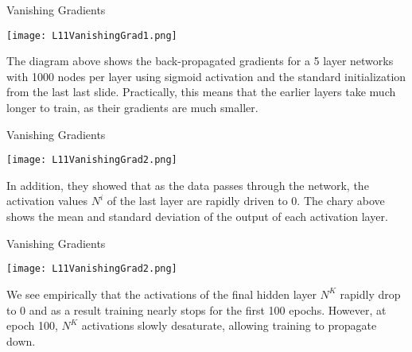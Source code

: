 \documentclass[10pt, table, dvipsnames,xcdraw,handout]{beamer}
\begin{document}
\begin{frame}[fragile]{Vanishing Gradients}
  \begin{minipage}[t][0.5\textheight][t]{\textwidth}
	\centering \texttt{[image: L11VanishingGrad1.png]} 
  \end{minipage}
  \vfill
\begin{minipage}[t][0.5\textheight][t]{\textwidth}
The diagram above shows the back-propagated gradients for a 5 layer networks with 1000 nodes per layer using sigmoid activation and the standard initialization from the last last slide.  Practically, this means that the earlier layers take much longer to train, as their gradients are much smaller.
\end{minipage}
\end{frame}



\begin{frame}[fragile]{Vanishing Gradients}
  \begin{minipage}[t][0.5\textheight][t]{\textwidth}
	\centering \texttt{[image: L11VanishingGrad2.png]} 
  \end{minipage}
  \vfill
\begin{minipage}[t][0.5\textheight][t]{\textwidth}
In addition, they showed that as the data passes through the network, the activation values $N^i$ of the last layer are rapidly driven to 0. The chary above shows the mean and standard deviation of the output of each activation layer.
\end{minipage}
\end{frame}



\begin{frame}[fragile]{Vanishing Gradients}
  \begin{minipage}[t][0.5\textheight][t]{\textwidth}
	\centering \texttt{[image: L11VanishingGrad2.png]} 
  \end{minipage}
  \vfill
\begin{minipage}[t][0.5\textheight][t]{\textwidth}
We see empirically that the activations of the final hidden layer $N^K$ rapidly drop to 0 and as a result training nearly stops for the first 100 epochs. However, at epoch 100, $N^K$ activations slowly desaturate, allowing training to propagate down. 
\end{minipage}
\end{frame}
\end{document}
